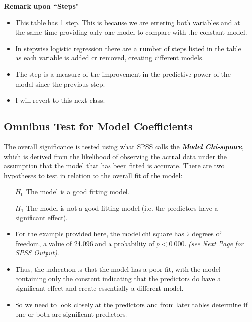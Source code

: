 \documentclass[a4paper,12pt]{article}
\begin{document}
\noindent \textbf{Remark upon ``Steps"}
\begin{itemize}
	\item This table has 1 step. This is because we are entering both variables and at the same
	time providing only one model to compare with the constant model. 
	\item In stepwise logistic regression there are a number of steps listed in the table as each variable is added or
	removed, creating different models. 
	\item The step is a measure of the improvement in the
	predictive power of the model since the previous step. 
	\item I will revert to this next class.
\end{itemize}
\newpage
\subsection{Omnibus Test for Model Coefficients}
The overall significance is tested using what SPSS calls the \textbf{\textit{Model Chi-square}}, which is derived from the likelihood of observing the actual data under the assumption that the model that has been fitted is accurate. There are two hypotheses to test in relation to the overall fit of the model:

\begin{framed}
	\begin{itemize}
		\item[$H_0$] The model is a good fitting model.
		\item[$H_1$] The model is not a good fitting model (i.e. the predictors have a significant effect).
	\end{itemize}
\end{framed}

\begin{itemize}
	\item For the example provided here, the model chi square has 2 degrees of freedom, a value of 24.096 and a probability of $p < 0.000$. \textit{(see Next Page for SPSS Output)}.
	
	\item Thus, the indication is that the model has a poor fit, with the model containing only the constant indicating that the predictors do have a significant effect and create essentially a different model. 
	\item So we need to look closely at
	the predictors and from later tables determine if one or both are significant predictors.
\end{itemize}
\bigskip
\end{document}
